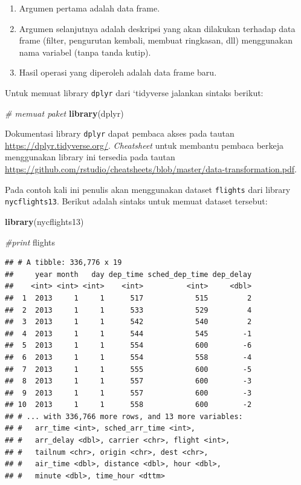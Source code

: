 \documentclass[]{book}
\newenvironment{Shaded}{\begin{snugshade}}{\end{snugshade}}
\newcommand{\KeywordTok}[1]{\textcolor[rgb]{0.13,0.29,0.53}{\textbf{#1}}}
\newcommand{\CommentTok}[1]{\textcolor[rgb]{0.56,0.35,0.01}{\textit{#1}}}
\newcommand{\NormalTok}[1]{#1}
\providecommand{\tightlist}{%
  \setlength{\itemsep}{0pt}\setlength{\parskip}{0pt}}
\begin{document}
\begin{enumerate}
\def\labelenumi{\arabic{enumi}.}
\tightlist
\item
  Argumen pertama adalah data frame.
\item
  Argumen selanjutnya adalah deskripsi yang akan dilakukan terhadap data
  frame (filter, pengurutan kembali, membuat ringkasan, dll) menggunakan
  nama variabel (tanpa tanda kutip).
\item
  Hasil operasi yang diperoleh adalah data frame baru.
\end{enumerate}

Untuk memuat library \texttt{dplyr} dari `tidyverse jalankan sintaks
berikut:

\begin{Shaded}
\begin{Highlighting}[]
\CommentTok{# memuat paket}
\KeywordTok{library}\NormalTok{(dplyr)}
\end{Highlighting}
\end{Shaded}

Dokumentasi library \texttt{dplyr} dapat pembaca akses pada tautan
\url{https://dplyr.tidyverse.org/}. \emph{Cheatsheet} untuk membantu
pembaca berkeja menggunakan library ini tersedia pada tautan
\url{https://github.com/rstudio/cheatsheets/blob/master/data-transformation.pdf}.

Pada contoh kali ini penulis akan menggunakan dataset \texttt{flights}
dari library \texttt{nycflights13}. Berikut adalah sintaks untuk memuat
dataset tersebut:

\begin{Shaded}
\begin{Highlighting}[]
\KeywordTok{library}\NormalTok{(nycflights13)}

\CommentTok{#print}
\NormalTok{flights}
\end{Highlighting}
\end{Shaded}

\begin{verbatim}
## # A tibble: 336,776 x 19
##     year month   day dep_time sched_dep_time dep_delay
##    <int> <int> <int>    <int>          <int>     <dbl>
##  1  2013     1     1      517            515         2
##  2  2013     1     1      533            529         4
##  3  2013     1     1      542            540         2
##  4  2013     1     1      544            545        -1
##  5  2013     1     1      554            600        -6
##  6  2013     1     1      554            558        -4
##  7  2013     1     1      555            600        -5
##  8  2013     1     1      557            600        -3
##  9  2013     1     1      557            600        -3
## 10  2013     1     1      558            600        -2
## # ... with 336,766 more rows, and 13 more variables:
## #   arr_time <int>, sched_arr_time <int>,
## #   arr_delay <dbl>, carrier <chr>, flight <int>,
## #   tailnum <chr>, origin <chr>, dest <chr>,
## #   air_time <dbl>, distance <dbl>, hour <dbl>,
## #   minute <dbl>, time_hour <dttm>
\end{verbatim}
\end{document}
